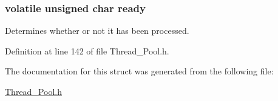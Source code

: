 \subsubsection[{ready}]{\setlength{\rightskip}{0pt plus 5cm}volatile unsigned char ready}\label{struct_result_a7ad32217267e7e0144abffa4e782867c}


Determines whether or not it has been processed. 



Definition at line 142 of file Thread\+\_\+\+Pool.\+h.



The documentation for this struct was generated from the following file\+:\begin{DoxyCompactItemize}
\item 
\hyperlink{_thread___pool_8h}{Thread\+\_\+\+Pool.\+h}\end{DoxyCompactItemize}
